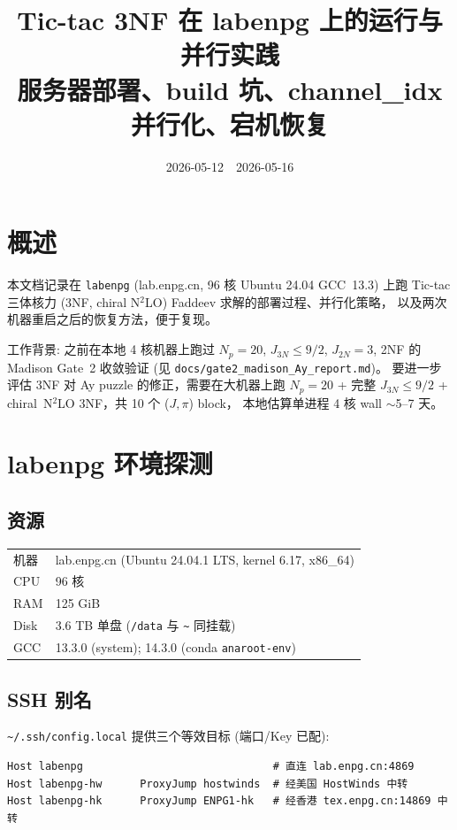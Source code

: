 \documentclass[11pt,a4paper]{article}
\title{Tic-tac 3NF 在 labenpg 上的运行与并行实践\\
\large 服务器部署、build 坑、channel\_idx 并行化、宕机恢复}
\author{}
\date{2026-05-12 \,\textendash\, 2026-05-16}
\begin{document}
\maketitle

\section{概述}

本文档记录在 \texttt{labenpg} (lab.enpg.cn, 96 核 Ubuntu 24.04 GCC~13.3) 上跑
Tic-tac 三体核力 (3NF, chiral N$^2$LO) Faddeev 求解的部署过程、并行化策略，
以及两次机器重启之后的恢复方法，便于复现。

工作背景: 之前在本地 4 核机器上跑过 $N_p=20$, $J_{3N}\le 9/2$, $J_{2N}=3$, 2NF 的
Madison Gate~2 收敛验证 (见 \texttt{docs/gate2\_madison\_Ay\_report.md})。
要进一步评估 3NF 对 Ay puzzle 的修正，需要在大机器上跑
$N_p=20$ + 完整 $J_{3N}\le 9/2$ + chiral~N$^2$LO 3NF，共 10 个 ($J,\pi$) block，
本地估算单进程 4 核 wall $\sim$5--7 天。

\section{labenpg 环境探测}

\subsection{资源}

\begin{tabularx}{\linewidth}{lX}
\toprule
机器 & lab.enpg.cn (Ubuntu 24.04.1 LTS, kernel 6.17, x86\_64) \\
CPU  & 96 核\\
RAM  & 125 GiB \\
Disk & 3.6 TB 单盘 (\texttt{/data} 与 \texttt{\textasciitilde{}} 同挂载) \\
GCC & 13.3.0 (system); 14.3.0 (conda \texttt{anaroot-env}) \\
\bottomrule
\end{tabularx}

\subsection{SSH 别名}

\texttt{\textasciitilde{}/.ssh/config.local} 提供三个等效目标 (端口/Key 已配):

\begin{lstlisting}
Host labenpg                              # 直连 lab.enpg.cn:4869
Host labenpg-hw      ProxyJump hostwinds  # 经美国 HostWinds 中转
Host labenpg-hk      ProxyJump ENPG1-hk   # 经香港 tex.enpg.cn:14869 中转
\end{lstlisting}
\end{document}
